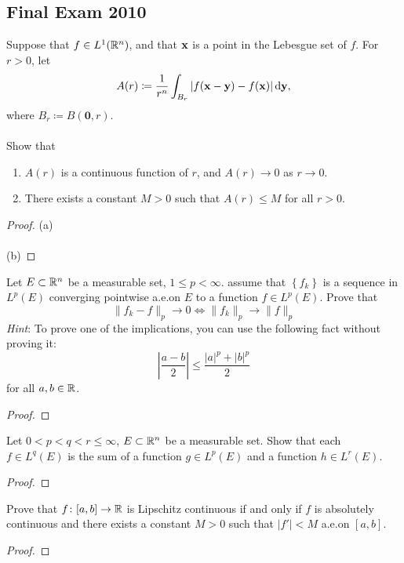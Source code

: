 \subsection{Final Exam 2010}
\begin{problem}
Suppose that $f\in L^1(\mathbb{R}^n)$, and that $\mathbf{x}$ is a point in the Lebesgue
set of $f$. For $r>0$, let
\[
A(r)\coloneqq \frac{1}{r^n}\int_{B_r}|f(\mathbf{x}-\mathbf{y})-f(\mathbf{x})|\mathop{}\!\mathrm{d}\mathbf{y},
\]
where $B_r\coloneqq B(\mathbf{0},r)$.
\\\\
Show that
\begin{enumerate}[label=(\alph*),noitemsep]
\item $A(r)$ is a continuous function of $r$, and $A(r)\to 0$ as $r\to 0$.
\item There exists a constant $M>0$ such that $A(r)\leq M$ for all $r>0$.
\end{enumerate}
\end{problem}
\begin{proof}
(a)
\\\\
(b)
\end{proof}

\begin{problem}
Let $E\subset\mathbb{R}^n$ be a measurable set, $1\leq p<\infty$. assume that
$\left\{ f_k \right\}$ is a sequence in $L^p(E)$ converging pointwise
a.e.\@ on $E$ to a function $f\in L^p(E)$. Prove that
\[
\|f_k-f\|_p\longrightarrow 0\iff
\|f_k\|_p\longrightarrow\|f\|_p
\]
\emph{Hint}: To prove one of the implications, you can use the following
fact without proving it:
\[
\left|
\frac{a-b}{2}
\right|
\leq
\frac{|a|^p+|b|^p}{2}
\]
for all $a,b\in\mathbb{R}$.
\end{problem}
\begin{proof}
\end{proof}

\begin{problem}
Let $0<p<q<r\leq\infty$, $E\subset\mathbb{R}^n$ be a measurable set. Show that
each $f\in L^q(E)$ is the sum of a function $g\in L^p(E)$ and a function
$h\in L^r(E)$.
\end{problem}
\begin{proof}
\end{proof}

\begin{problem}
Prove that $f\colon[a,b]\to\mathbb{R}$ is Lipschitz continuous if and only if $f$
is absolutely continuous and there exists a constant $M>0$ such that
$|f'|<M$ a.e.\@ on $[a,b]$.
\end{problem}
\begin{proof}
\end{proof}

